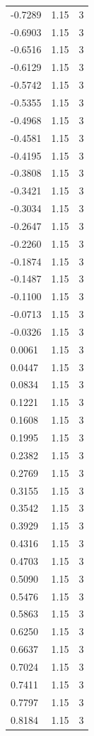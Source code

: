 \begin{longtable}{lrr}
  -0.7289 & 1.15 & 3 \\
  -0.6903 & 1.15 & 3 \\
  -0.6516 & 1.15 & 3 \\
  -0.6129 & 1.15 & 3 \\
  -0.5742 & 1.15 & 3 \\
  -0.5355 & 1.15 & 3 \\
  -0.4968 & 1.15 & 3 \\
  -0.4581 & 1.15 & 3 \\
  -0.4195 & 1.15 & 3 \\
  -0.3808 & 1.15 & 3 \\
  -0.3421 & 1.15 & 3 \\
  -0.3034 & 1.15 & 3 \\
  -0.2647 & 1.15 & 3 \\
  -0.2260 & 1.15 & 3 \\
  -0.1874 & 1.15 & 3 \\
  -0.1487 & 1.15 & 3 \\
  -0.1100 & 1.15 & 3 \\
  -0.0713 & 1.15 & 3 \\
  -0.0326 & 1.15 & 3 \\
  0.0061 & 1.15 & 3 \\
  0.0447 & 1.15 & 3 \\
  0.0834 & 1.15 & 3 \\
  0.1221 & 1.15 & 3 \\
  0.1608 & 1.15 & 3 \\
  0.1995 & 1.15 & 3 \\
  0.2382 & 1.15 & 3 \\
  0.2769 & 1.15 & 3 \\
  0.3155 & 1.15 & 3 \\
  0.3542 & 1.15 & 3 \\
  0.3929 & 1.15 & 3 \\
  0.4316 & 1.15 & 3 \\
  0.4703 & 1.15 & 3 \\
  0.5090 & 1.15 & 3 \\
  0.5476 & 1.15 & 3 \\
  0.5863 & 1.15 & 3 \\
  0.6250 & 1.15 & 3 \\
  0.6637 & 1.15 & 3 \\
  0.7024 & 1.15 & 3 \\
  0.7411 & 1.15 & 3 \\
  0.7797 & 1.15 & 3 \\
  0.8184 & 1.15 & 3 \\

\end{longtable}
